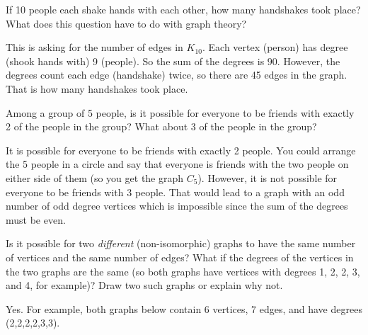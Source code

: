 \begin{questions}
\question If 10 people each shake hands with each other, how many handshakes took place?  What does this question have to do with graph theory?

	\begin{answer}
		This is asking for the number of edges in $K_{10}$.  Each vertex (person) has degree (shook hands with) 9 (people).  So the sum of the degrees is $90$.  However, the degrees count each edge (handshake) twice, so there are 45 edges in the graph.  That is how many handshakes took place.%
	\end{answer}




\question Among a group of 5 people, is it possible for everyone to be friends with exactly 2 of the people in the group?  What about 3 of the people in the group?

	\begin{answer}
		It is possible for everyone to be friends with exactly 2 people.  You could arrange the 5 people in a circle and say that everyone is friends with the two people on either side of them (so you get the graph $C_5$).  However, it is not possible for everyone to be friends with 3 people.  That would lead to a graph with an odd number of odd degree vertices which is impossible since the sum of the degrees must be even.  %
	\end{answer}





\question Is it possible for two {\em different} (non-isomorphic) graphs to have the same number of vertices and the same number of edges?  What if the degrees of the vertices in the two graphs are the same (so both graphs have vertices with degrees 1, 2, 2, 3, and 4, for example)?  Draw two such graphs or explain why not.

	\begin{answer}
		Yes.  For example, both graphs below contain 6 vertices, 7 edges, and have degrees (2,2,2,2,3,3).
		\begin{center}
		  \hfill
		  \hfill
		  \hfill ~
		\end{center}
	\end{answer}









\end{questions}
